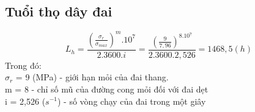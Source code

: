 \subsection{Tuổi thọ dây đai}
\[
    L_h = \frac{(\frac{\sigma_r}{\sigma_{max}})^m.10^7}{2.3600.i} = \frac{(\frac{9}{7,96})^8.10^7}{2.3600.2,526} = 1468,5 (h)
\]
Trong đó:\\
$\sigma_r$ = 9 (MPa) - giới hạn mỏi của đai thang.\\
m = 8 - chỉ số mũ của đường cong mỏi đối với đai dẹt\\
i = 2,526 ($s^{-1}$) - số vòng chạy của đai trong một giây\\
\cleardoublepage